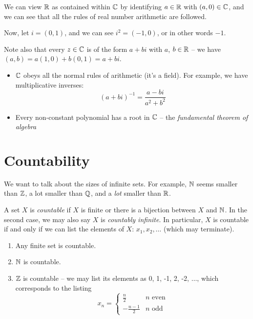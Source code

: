 \documentclass{../../template/note}
\begin{document}
    We can view \(\mathbb R\) as contained within \(\mathbb C\) by identifying \(a \in \mathbb R\) with \((a, 0) \in \mathbb C\), and we can see that all the rules of real number arithmetic are followed.
    
    Now, let \(i = (0, 1)\), and we can see \(i^2 = (-1, 0)\), or in other words \(-1\).

    Note also that every \(z \in \mathbb C\) is of the form \(a+bi\) with \(a\), \(b \in \mathbb R\) -- we have \((a, b) = a(1, 0) + b(0, 1) = a + bi\).

    \begin{remark*}
        \begin{itemize}
            \item \(\mathbb C\) obeys all the normal rules of arithmetic (it's a field). For example, we have multiplicative inverses:
            \[
                (a+bi)^{-1} = \frac{a-bi}{a^2+b^2}
            \]
            \item Every non-constant polynomial has a root in \(\mathbb C\) -- the \emph{fundamental theorem of algebra}
        \end{itemize}
    \end{remark*}
    
    \section{Countability}

    We want to talk about the sizes of infinite sets. For example, \(\mathbb N\) seems smaller than \(\mathbb Z\), a lot smaller than \(\mathbb Q\), and a \emph{lot} smaller than \(\mathbb R\).

    \begin{definition}
        A set \(X\) is \emph{countable} if \(X\) is finite or there is a bijection between \(X\) and \(\mathbb N\). In the second case, we may also say \(X\) is \emph{countably infinite}. In particular, \(X\) is countable if and only if we can list the elements of \(X\): \(x_1, x_2, \dots\) (which may terminate).
    \end{definition}
    
    \begin{example}
        \begin{enumerate}[label=\protect\circled{\arabic*}]
            \item Any finite set is countable.
            \item \(\mathbb N\) is countable.
            \item \(\mathbb Z\) is countable -- we may list its elements as 0, 1, -1, 2, -2, \(\dots\), which corresponds to the listing
            \[
                x_n = \begin{cases}
                    \frac{n}{2} & n \text{ even} \\
                    -\frac{n-1}{2} & n \text{ odd}
                \end{cases}
            \]
        \end{enumerate}
    \end{example}
    
\end{document}
